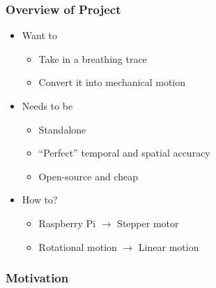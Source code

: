 \documentclass{beamer}
\begin{document}
\begin{frame}

    \frametitle{Overview of Project}

    \begin{itemize}
        \item Want to
            \begin{itemize}
                \item Take in a breathing trace
                \item Convert it into mechanical motion
            \end{itemize}
            \vspace{1em}
        \item Needs to be
            \begin{itemize}
                \item Standalone
                \item ``Perfect'' temporal and spatial accuracy
                \item Open-source and cheap
            \end{itemize}
            \vspace{1em}
        \item How to?
            \begin{itemize}
                \item Raspberry Pi $\rightarrow$ Stepper motor
                \item Rotational motion $\rightarrow$ Linear motion
            \end{itemize}
    \end{itemize}

\end{frame}

\begin{frame}

    \frametitle{}

\end{frame}

\begin{frame}

    \frametitle{Motivation}

\end{frame}
\end{document}
